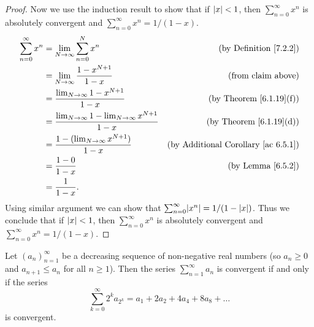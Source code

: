 \begin{proof}
    Now we use the induction result to show that if \(\abs*{x} < 1\), then \(\sum_{n = 0}^\infty x^n\) is absolutely convergent and \(\sum_{n = 0}^\infty x^n = 1 / (1 - x)\).
    \begin{align*}
        \sum_{n = 0}^\infty x^n & = \lim_{N \to \infty} \sum_{n = 0}^N x^n                              & \text{(by Definition \ref{7.2.2})}              \\
                                & = \lim_{N \to \infty} \frac{1 - x^{N + 1}}{1 - x}                     & \text{(from claim above)}                       \\
                                & = \frac{\lim_{N \to \infty} 1 - x^{N + 1}}{1 - x}                     & \text{(by Theorem \ref{6.1.19}(f))}             \\
                                & = \frac{\lim_{N \to \infty} 1 - \lim_{N \to \infty} x^{N + 1}}{1 - x} & \text{(by Theorem \ref{6.1.19}(d))}             \\
                                & = \frac{1 - (\lim_{N \to \infty} x^{N + 1})}{1 - x}                   & \text{(by Additional Corollary \ref{ac 6.5.1})} \\
                                & = \frac{1 - 0}{1 - x}                                                 & \text{(by Lemma \ref{6.5.2})}                   \\
                                & = \frac{1}{1 - x}.
    \end{align*}
    Using similar argument we can show that \(\sum_{n = 0}^\infty \abs*{x^n} = 1 / (1 - \abs*{x})\).
    Thus we conclude that if \(\abs*{x} < 1\), then \(\sum_{n = 0}^\infty x^n\) is absolutely convergent and \(\sum_{n = 0}^\infty x^n = 1 / (1 - x)\).
\end{proof}

\begin{proposition}\label{7.3.4}
    Let \((a_n)_{n = 1}^\infty\) be a decreasing sequence of non-negative real numbers
    (so \(a_n \geq 0\) and \(a_{n + 1} \leq a_n\) for all \(n \geq 1\)).
    Then the series \(\sum_{n = 1}^\infty a_n\) is convergent if and only if the series
    \[
        \sum_{k = 0}^\infty 2^k a_{2^k} = a_1 + 2a_2 + 4a_4 + 8a_8 + \dots
    \]
    is convergent.
\end{proposition}

